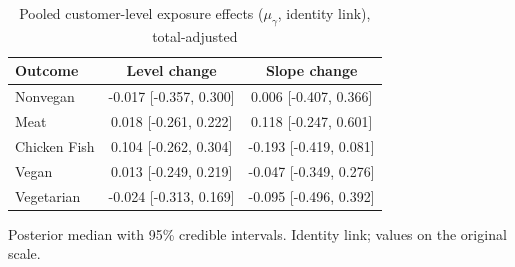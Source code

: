 \begin{table}[H]
\centering
\caption{Pooled customer-level exposure effects ($\mu_\gamma$, identity link), total-adjusted}
\label{tab:a5_mu_gamma_adj}
\begin{tabular}{lcc}
\toprule
Outcome & Level change & Slope change \\
\midrule
Nonvegan & -0.017 [-0.357, 0.300] & 0.006 [-0.407, 0.366] \\
Meat & 0.018 [-0.261, 0.222] & 0.118 [-0.247, 0.601] \\
Chicken Fish & 0.104 [-0.262, 0.304] & -0.193 [-0.419, 0.081] \\
Vegan & 0.013 [-0.249, 0.219] & -0.047 [-0.349, 0.276] \\
Vegetarian & -0.024 [-0.313, 0.169] & -0.095 [-0.496, 0.392] \\
\bottomrule
\end{tabular}
\par\smallskip\footnotesize Posterior median with 95\% credible intervals. Identity link; values on the original scale.
\end{table}
